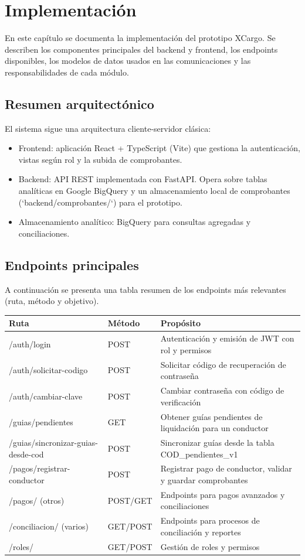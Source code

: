 \chapter{Implementación}

En este capítulo se documenta la implementación del prototipo XCargo. Se describen los componentes principales del backend y frontend, los endpoints disponibles, los modelos de datos usados en las comunicaciones y las responsabilidades de cada módulo.

\section{Resumen arquitectónico}
El sistema sigue una arquitectura cliente-servidor clásica:
\begin{itemize}
\item Frontend: aplicación React + TypeScript (Vite) que gestiona la autenticación, vistas según rol y la subida de comprobantes.
\item Backend: API REST implementada con FastAPI. Opera sobre tablas analíticas en Google BigQuery y un almacenamiento local de comprobantes (`backend/comprobantes/`) para el prototipo.
\item Almacenamiento analítico: BigQuery para consultas agregadas y conciliaciones.
\end{itemize}

\section{Endpoints principales}
A continuación se presenta una tabla resumen de los endpoints más relevantes (ruta, método y objetivo).

\begin{tabular}{p{5cm} p{2cm} p{8cm}}
Ruta & Método & Propósito \\
\hline
/auth/login & POST & Autenticación y emisión de JWT con rol y permisos \\
/auth/solicitar-codigo & POST & Solicitar código de recuperación de contraseña \\
/auth/cambiar-clave & POST & Cambiar contraseña con código de verificación \\
/guias/pendientes & GET & Obtener guías pendientes de liquidación para un conductor \\
/guias/sincronizar-guias-desde-cod & POST & Sincronizar guías desde la tabla COD_pendientes_v1 \\
/pagos/registrar-conductor & POST & Registrar pago de conductor, validar y guardar comprobantes \\
/pagos/ (otros) & POST/GET & Endpoints para pagos avanzados y conciliaciones \\
/conciliacion/ (varios) & GET/POST & Endpoints para procesos de conciliación y reportes \\
/roles/ & GET/POST & Gestión de roles y permisos \\
\end{tabular}

